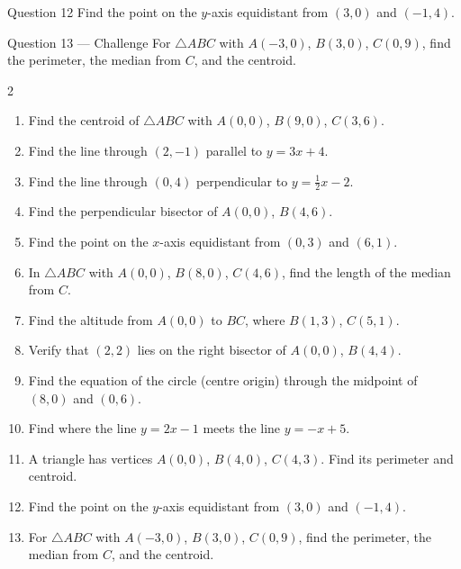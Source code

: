 \documentclass[11pt]{article}
\begin{document}
\begin{qbox}{Question 12}
Find the point on the $y$-axis equidistant from $(3,0)$ and $(-1,4)$.\workspace{2.8cm}
\end{qbox}

\begin{qbox}{Question 13 --- Challenge}
For $\triangle ABC$ with $A(-3,0)$, $B(3,0)$, $C(0,9)$, find the perimeter, the median from $C$, and the centroid.\workspace{3.4cm}
\end{qbox}

\clearpage
{}

\begin{recapbox}
\begin{multicols}{2}
\small
\begin{enumerate}[leftmargin=*,itemsep=3pt]
  \item Find the centroid of $\triangle ABC$ with $A(0,0)$, $B(9,0)$, $C(3,6)$.
  \item Find the line through $(2,-1)$ parallel to $y=3x+4$.
  \item Find the line through $(0,4)$ perpendicular to $y=\tfrac12x-2$.
  \item Find the perpendicular bisector of $A(0,0)$, $B(4,6)$.
  \item Find the point on the $x$-axis equidistant from $(0,3)$ and $(6,1)$.
  \item In $\triangle ABC$ with $A(0,0)$, $B(8,0)$, $C(4,6)$, find the length of the median from $C$.
  \item Find the altitude from $A(0,0)$ to $BC$, where $B(1,3)$, $C(5,1)$.
  \item Verify that $(2,2)$ lies on the right bisector of $A(0,0)$, $B(4,4)$.
  \item Find the equation of the circle (centre origin) through the midpoint of $(8,0)$ and $(0,6)$.
  \item Find where the line $y=2x-1$ meets the line $y=-x+5$.
  \item A triangle has vertices $A(0,0)$, $B(4,0)$, $C(4,3)$. Find its perimeter and centroid.
  \item Find the point on the $y$-axis equidistant from $(3,0)$ and $(-1,4)$.
  \item For $\triangle ABC$ with $A(-3,0)$, $B(3,0)$, $C(0,9)$, find the perimeter, the median from $C$, and the centroid.
\end{enumerate}
\end{multicols}
\end{recapbox}
\end{document}
